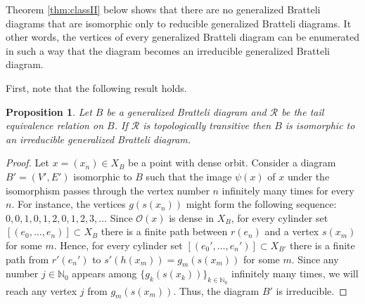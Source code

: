 \documentclass[11pt, twoside]{amsart}
\theoremstyle{definition}
\theoremstyle{remark}
\theoremstyle{plain}
\newtheorem{prop}[definition]{Proposition}
\newcommand{\tcb}{\textcolor{blue}}
\newcommand{\tcr}{\textcolor{red}}
\newcommand{\N}{\mathbb N}
\numberwithin{equation}{section}
\begin{document}
Theorem \ref{thm:classII} below shows that there are no generalized Bratteli diagrams that are isomorphic only to reducible generalized Bratteli diagrams. It other words, the vertices of every generalized Bratteli diagram can be enumerated in such a way that the diagram becomes an irreducible generalized Bratteli diagram.

First, note that the following result  holds.

\begin{prop}
\label{prop:toptransirred}
     Let $B$ be a generalized Bratteli diagram and $\mathcal{R}$ be the tail equivalence relation on $B$. If $\mathcal{R}$ is topologically transitive then $B$ is isomorphic to an irreducible generalized Bratteli diagram.
\end{prop}

\begin{proof}
    Let $x = (x_n) \in X_B$ be a point with dense orbit. Consider a diagram $B'=(V',E')$ isomorphic to $B$ such that the image $\psi(x)$ of $x$ under the isomorphism passes through the vertex number $n$ infinitely many times for every $n$. For instance, the vertices $g(s(x_n))$ might form the following sequence: $0, 0, 1, 0, 1, 2, 0, 1, 2, 3,\ldots$ Since $\mathcal{O}(x)$ is dense in $X_B$, for every cylinder set $[(e_0, \ldots, e_n)] \subset X_B$ there is a finite path between $r(e_n)$ and a vertex $s(x_m)$ for some $m$. Hence, for every cylinder set $[(e_0', \ldots, e_n')] \subset X_{B'}$ there is a finite path from $r'(e_n')$ to $s'(h(x_m)) = g_m(s(x_m))$ for some $m$. Since any number $j \in \N_0$ appears among $\{g_k(s(x_k))\}_{k \in \N_0}$ infinitely many times, we will reach any vertex $j$ from $g_m(s(x_m))$. Thus, the diagram $B'$ is irreducible.
\end{proof}
\end{document}
